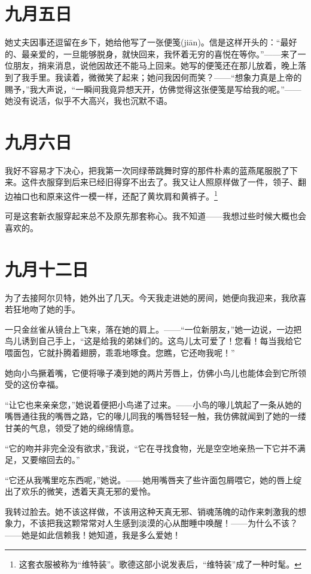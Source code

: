 \documentclass[12pt,oneside]{book}
\begin{document}
\chapter{九月五日}
\label{sec-4-13}
她丈夫因事还逗留在乡下，她给他写了一张便笺(jiān)。信是这样开头的：“最好的、最亲爱的，一旦能够脱身，就快回来，我怀着无穷的喜悦在等你。”——来了一位朋友，捎来消息，说他因故还不能马上回来。她写的便笺还在那儿放着，晚上落到了我手里。我读着，微微笑了起来；她问我因何而笑？——“想象力真是上帝的赐予，”我大声说，“一瞬间我竟异想天开，仿佛觉得这张便笺是写给我的呢。”——她没有说活，似乎不大高兴，我也沉默不语。
　　
\chapter{九月六日}
\label{sec-4-14}
我好不容易才下决心，把我第一次同绿蒂跳舞时穿的那件朴素的蓝燕尾服脱了下来。这件衣服穿到后来已经旧得穿不出去了。我又让人照原样做了一件，领子、翻边袖口也和原来这件一模一样，还配了黄坎肩和黄裤子。\footnote{这套衣服被称为“维特装”。歌德这部小说发表后，“维特装”成了一种时髦。}

可是这套新衣服穿起来总不及原先那套称心。我不知道——我想过些时候大概也会喜欢的。
　　

\chapter{九月十二日}
\label{sec-4-15}
为了去接阿尔贝特，她外出了几天。今天我走进她的房间，她便向我迎来，我欣喜若狂地吻了她的手。

一只金丝雀从镜台上飞来，落在她的肩上。——“一位新朋友，”她一边说，一边把鸟儿诱到自己手上，“这是给我的弟妹们的。这鸟儿太可爱了！您看！每当我给它喂面包，它就扑腾着翅膀，乖乖地啄食。您瞧，它还吻我呢！”

她向小鸟撅着嘴，它便将喙子凑到她的两片芳唇上，仿佛小鸟儿也能体会到它所领受的这份幸福。

“让它也来亲亲您，”她说着便把小鸟递了过来。——小鸟的喙儿筑起了一条从她的嘴唇通往我的嘴唇之路，它的喙儿同我的嘴唇轻轻一触，我仿佛就闻到了她的一缕甘美的气息，领受了她的绵绵情意。

“它的吻并非完全没有欲求，”我说，“它在寻找食物，光是空空地亲热一下它并不满足，又要缩回去的。”

“它还从我嘴里吃东西呢，”她说。——她用嘴唇夹了些许面包屑喂它，她的唇上绽出了欢乐的微笑，透着天真无邪的爱怜。

我转过脸去。她不该这样做，不该用这种天真无邪、销魂荡魄的动作来刺激我的想象力，不该把我这颗常常对人生感到淡漠的心从酣睡中唤醒！——为什么不该？——她是如此信赖我！她知道，我是多么爱她！
　　
\end{document}
